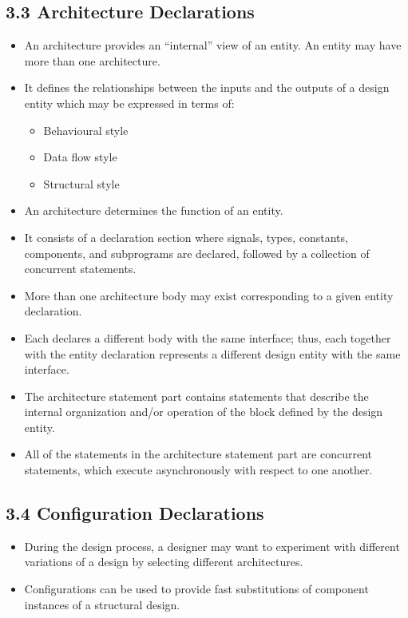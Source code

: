 \documentclass[a4paper,12pt]{article}
\begin{document}
	\subsection*{3.3 Architecture Declarations}
	\begin{itemize}[noitemsep]
		\item An architecture provides an “internal” view of an entity. An entity may have more than one architecture.
		\item It defines the relationships between the inputs and the outputs of a design entity which may be expressed in terms of:
		\begin{itemize}[noitemsep]
			\item Behavioural style
			\item Data flow style
			\item Structural style
		\end{itemize}
		\item An architecture determines the function of an entity.
		\item It consists of a declaration section where signals, types, constants, components, and subprograms are declared, followed by a collection of concurrent statements.
		\item More than one architecture body may exist corresponding to a given entity declaration.
		\item Each declares a different body with the same interface; thus, each together with the entity declaration represents a different design entity with the same interface.
		\item The architecture statement part contains statements that describe the internal organization and/or operation of the block defined by the design entity.
		\item All of the statements in the architecture statement part are concurrent statements, which execute asynchronously with respect to one another.
	\end{itemize}
	
	\subsection*{3.4 Configuration Declarations}
	\begin{itemize}[noitemsep]
		\item During the design process, a designer may want to experiment with different variations of a design by selecting different architectures.
		\item Configurations can be used to provide fast substitutions of component instances of a structural design.
	\end{itemize}
	
\end{document}
